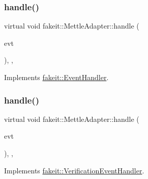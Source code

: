 \subsubsection{\texorpdfstring{handle()}{handle()}\hspace{0.1cm}{\footnotesize\ttfamily [4/6]}}
{\footnotesize\ttfamily virtual void fakeit\+::\+Mettle\+Adapter\+::handle (\begin{DoxyParamCaption}\item[{const \mbox{\hyperlink{structfakeit_1_1UnexpectedMethodCallEvent}{Unexpected\+Method\+Call\+Event}} \&}]{evt }\end{DoxyParamCaption})\hspace{0.3cm}{\ttfamily [inline]}, {\ttfamily [override]}, {\ttfamily [virtual]}}



Implements \mbox{\hyperlink{structfakeit_1_1EventHandler_a4de5ad05e5de73e36f4b2cede6d8efd3}{fakeit\+::\+Event\+Handler}}.

\mbox{\label{structfakeit_1_1MettleAdapter_a99ed1d275645c78140a55f0a7110b281}} 
\subsubsection{\texorpdfstring{handle()}{handle()}\hspace{0.1cm}{\footnotesize\ttfamily [5/6]}}
{\footnotesize\ttfamily virtual void fakeit\+::\+Mettle\+Adapter\+::handle (\begin{DoxyParamCaption}\item[{const \mbox{\hyperlink{structfakeit_1_1SequenceVerificationEvent}{Sequence\+Verification\+Event}} \&}]{evt }\end{DoxyParamCaption})\hspace{0.3cm}{\ttfamily [inline]}, {\ttfamily [override]}, {\ttfamily [virtual]}}



Implements \mbox{\hyperlink{structfakeit_1_1VerificationEventHandler_adf355a9888bc2bf78ce0e1219bfb1379}{fakeit\+::\+Verification\+Event\+Handler}}.

\mbox{\label{structfakeit_1_1MettleAdapter_a1256c2d0349a01abb4f0e348c90fc59b}} 
